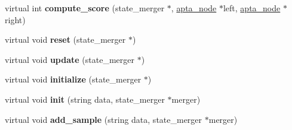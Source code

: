 \begin{DoxyCompactItemize}
\item 
virtual int {\bfseries compute\+\_\+score} (state\+\_\+merger $\ast$, \hyperlink{classapta__node}{apta\+\_\+node} $\ast$left, \hyperlink{classapta__node}{apta\+\_\+node} $\ast$right)\hypertarget{classevaluation__function_a36e533923cde5358ecb74ad40e46f1f9}{}\label{classevaluation__function_a36e533923cde5358ecb74ad40e46f1f9}

\item 
virtual void {\bfseries reset} (state\+\_\+merger $\ast$)\hypertarget{classevaluation__function_acc457754e1aff5d9e20cf51ea8976f37}{}\label{classevaluation__function_acc457754e1aff5d9e20cf51ea8976f37}

\item 
virtual void {\bfseries update} (state\+\_\+merger $\ast$)\hypertarget{classevaluation__function_af2c5134a769ccfd8703608b16a4ede06}{}\label{classevaluation__function_af2c5134a769ccfd8703608b16a4ede06}

\item 
virtual void {\bfseries initialize} (state\+\_\+merger $\ast$)\hypertarget{classevaluation__function_af15dfb9e27651870fbabf8b8355faefc}{}\label{classevaluation__function_af15dfb9e27651870fbabf8b8355faefc}

\item 
virtual void {\bfseries init} (string data, state\+\_\+merger $\ast$merger)\hypertarget{classevaluation__function_aea7c6d5884be03430212d55b3dd546ea}{}\label{classevaluation__function_aea7c6d5884be03430212d55b3dd546ea}

\item 
virtual void {\bfseries add\+\_\+sample} (string data, state\+\_\+merger $\ast$merger)\hypertarget{classevaluation__function_a5b63865df7d337aa0c258b7c795dd6c6}{}\label{classevaluation__function_a5b63865df7d337aa0c258b7c795dd6c6}

\end{DoxyCompactItemize}
